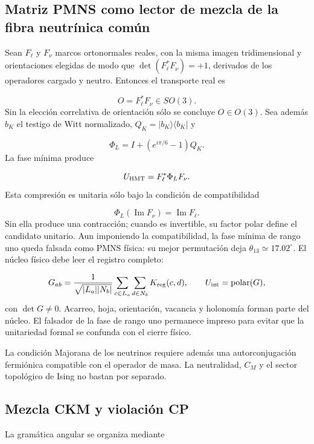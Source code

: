 
\subsection{Matriz PMNS como lector de mezcla de la fibra neutrínica común}
Sean \(F_\ell\) y \(F_\nu\) marcos ortonormales reales, con la misma imagen tridimensional y orientaciones elegidas de modo que \(\det(F_\ell^*F_\nu)=+1\), derivados de los operadores cargado y neutro. Entonces el transporte real es

\[
O=F_\ell^*F_\nu\in SO(3).
\]
Sin la elección correlativa de orientación sólo se concluye \(O\in O(3)\). Sea además \(b_K\) el testigo de Witt normalizado, \(Q_K=|b_K\rangle\langle b_K|\) y

\[
\Phi_L=I+(e^{i\pi/6}-1)Q_K.
\]
La fase mínima produce

\[
U_{\rm HMT}=F_\ell^*\Phi_LF_\nu.
\]
Esta compresión es unitaria sólo bajo la condición de compatibilidad

\[
\Phi_L(\operatorname{Im}F_\nu)=\operatorname{Im}F_\ell.
\]
Sin ella produce una contracción; cuando es invertible, su factor polar define el candidato unitario. Aun imponiendo la compatibilidad, la fase mínima de rango uno queda falsada como PMNS física: su mejor permutación deja \(\theta_{13}\simeq17.02^\circ\). El núcleo físico debe leer el registro completo:

\[
G_{ab}=
\frac1{\sqrt{|L_a||N_b|}}
\sum_{c\in L_a}\sum_{d\in N_b}K_{\rm reg}(c,d),
\qquad
U_{\rm int}=\operatorname{polar}(G),
\]
con \(\det G\ne0\). Acarreo, hoja, orientación, vacancia y holonomía forman parte del núcleo. El falsador de la fase de rango uno permanece impreso para evitar que la unitariedad formal se confunda con el cierre físico.

La condición Majorana de los neutrinos requiere además una autorconjugación fermiónica compatible con el operador de masa. La neutralidad, \(C_M\) y el sector topológico de Ising no bastan por separado.

\subsection{Mezcla CKM y violación CP}
La gramática angular se organiza mediante

